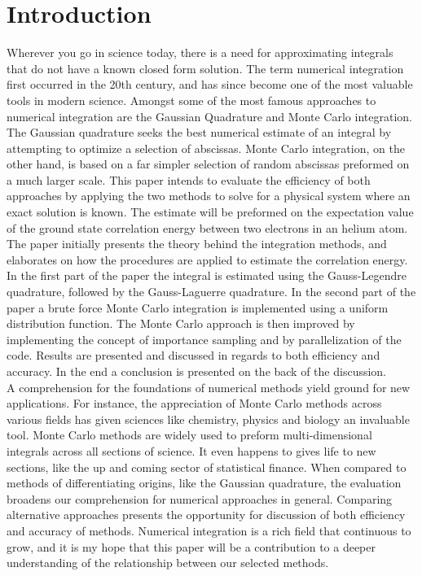 \documentclass[%
reprint,nofootinbib,
amsmath,amssymb,
aps,
]{revtex4-1}
\begin{document}
\section{Introduction}
\vspace{5mm}
\twocolumngrid \noindent
Wherever you go in science today, there is a need for approximating integrals that do not have a known closed form solution. The term numerical integration first occurred in the 20th century, and has since become one of the most valuable tools in modern science. Amongst some of the most famous approaches to numerical integration are the Gaussian Quadrature and Monte Carlo integration. The Gaussian quadrature seeks the best numerical estimate of an integral by attempting to optimize a selection of abscissas. Monte Carlo integration, on the other hand, is based on a far simpler selection of random abscissas preformed on a much larger scale. This paper intends to evaluate the efficiency of both approaches by applying the two methods to solve for a physical system where an exact solution is known. The estimate will be preformed on the expectation value of the ground state correlation energy between two electrons in an helium atom. \\
\indent The paper initially presents the theory behind the integration methods, and elaborates on how the procedures are applied to estimate the correlation energy. In the first part of the paper the integral is estimated using the Gauss-Legendre quadrature, followed by the Gauss-Laguerre quadrature. In the second part of the paper a brute force Monte Carlo integration is implemented using a uniform distribution function. The Monte Carlo approach is then improved by implementing the concept of importance sampling and by parallelization of the code. Results are presented and discussed in regards to both efficiency and accuracy. In the end a conclusion is presented on the back of the discussion. \\ \indent 
A comprehension for the foundations of numerical methods yield ground for new applications. For instance, the appreciation of Monte Carlo methods across various fields has given sciences like chemistry, physics and biology an invaluable tool. Monte Carlo methods are widely used to preform  multi-dimensional integrals across all sections of science. It even happens to gives life to new sections, like the up and coming sector of statistical finance. When compared to methods of differentiating origins, like the Gaussian quadrature, the evaluation broadens our comprehension for numerical approaches in general. Comparing alternative approaches presents the  opportunity for discussion of both efficiency and accuracy of methods. Numerical integration is a rich field that continuous to grow, and it is my hope that this paper will be a contribution to a deeper understanding of the relationship between our selected methods. \newpage 
 
\end{document}
